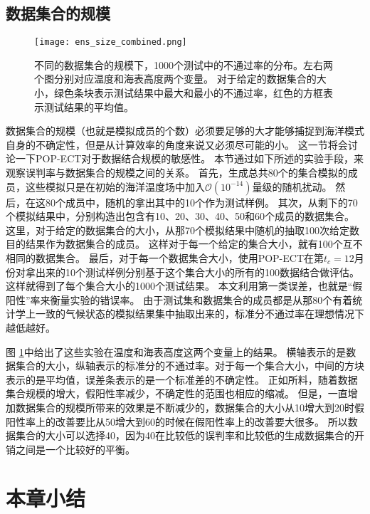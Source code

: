 \subsection{数据集合的规模} \label{verify:ens}

\begin{figure} 
\centering
\texttt{[image: ens\_size\_combined.png]}
\caption{ 不同的数据集合的规模下，1000个测试中的不通过率的分布。左右两个图分别对应温度和海表高度两个变量。
对于给定的数据集合的大小，绿色条块表示测试结果中最大和最小的不通过率，红色的方框表示测试结果的平均值。}
\label{fig:temp_ens_80}
\end {figure}
数据集合的规模（也就是模拟成员的个数）必须要足够的大才能够捕捉到海洋模式自身的不确定性，但是从计算效率的角度来说又必须尽可能的小。
这一节将会讨论一下POP-ECT对于数据结合规模的敏感性。
本节通过如下所述的实验手段，来观察误判率与数据集合的规模之间的关系。 
首先，生成总共80个的集合模拟的成员，这些模拟只是在初始的海洋温度场中加入$\mathcal{O}(10^{-14})$量级的随机扰动。 
然后，在这80个成员中，随机的拿出其中的10个作为测试样例。 
其次，从剩下的70个模拟结果中，分别构造出包含有10、20、30、40、50和60个成员的数据集合。 
这里，对于给定的数据集合的大小，从那70个模拟结果中随机的抽取100次给定数目的结果作为数据集合的成员。
这样对于每一个给定的集合大小，就有100个互不相同的数据集合。 
最后，对于每一个数据集合大小，使用POP-ECT在第$t_c = 12$月份对拿出来的10个测试样例分别基于这个集合大小的所有的100数据结合做评估。
这样就得到了每个集合大小的1000个测试结果。
本文利用第一类误差，也就是“假阳性”率来衡量实验的错误率。 
由于测试集和数据集合的成员都是从那80个有着统计学上一致的气候状态的模拟结果集中抽取出来的，标准分不通过率在理想情况下越低越好。 

图 \ref{fig:temp_ens_80}中给出了这些实验在温度和海表高度这两个变量上的结果。 
横轴表示的是数据集合的大小，纵轴表示的标准分的不通过率。对于每一个集合大小，中间的方块表示的是平均值，误差条表示的是一个标准差的不确定性。
正如所料，随着数据集合规模的增大，假阳性率减少，不确定性的范围也相应的缩减。 
但是，一直增加数据集合的规模所带来的效果是不断减少的，数据集合的大小从10增大到20时假阳性率上的改善要比从50增大到60的时候在假阳性率上的改善要大很多。 
所以数据集合的大小可以选择40，因为40在比较低的误判率和比较低的生成数据集合的开销之间是一个比较好的平衡。 
 

\section{本章小结}
\label{verify:Conclusion}

